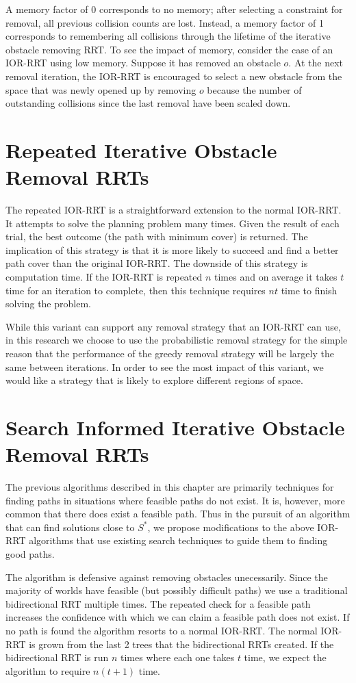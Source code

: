 A memory factor of 0 corresponds to no memory; after selecting a constraint for removal, all previous collision counts are lost. Instead, a memory factor of 1 corresponds to remembering all collisions through the lifetime of the iterative obstacle removing RRT. To see the impact of memory, consider the case of an IOR-RRT using low memory. Suppose it has removed an obstacle $o$. At the next removal iteration, the IOR-RRT is encouraged to select a new obstacle from the space that was newly opened up by removing $o$ because the number of outstanding collisions since the last removal have been scaled down. 

\section{Repeated Iterative Obstacle Removal RRTs}
The repeated IOR-RRT is a straightforward extension to the normal IOR-RRT. It attempts to solve the planning problem many times. Given the result of each trial, the best outcome (the path with minimum cover) is returned. The implication of this strategy is that it is more likely to succeed and find a better path cover than the original IOR-RRT. The downside of this strategy is computation time. If the IOR-RRT is repeated $n$ times and on average it takes $t$ time for an iteration to complete, then this technique requires $nt$ time to finish solving the problem.

While this variant can support any removal strategy that an IOR-RRT can use, in this research we choose to use the probabilistic removal strategy for the simple reason that the performance of the greedy removal strategy will be largely the same between iterations. In order to see the most impact of this variant, we would like a strategy that is likely to explore different regions of space.

\section{Search Informed Iterative Obstacle Removal RRTs}
The previous algorithms described in this chapter are primarily techniques for finding paths in situations where feasible paths do not exist. It is, however, more common that there does exist a feasible path. Thus in the pursuit of an algorithm that can find solutions close to $S^{*}$, we propose modifications to the above IOR-RRT algorithms that use existing search techniques to guide them to finding good paths.

The algorithm is defensive against removing obstacles unecessarily. Since the majority of worlds have feasible (but possibly difficult paths) we use a traditional bidirectional RRT multiple times. The repeated check for a feasible path increases the confidence with which we can claim a feasible path does not exist. If no path is found the algorithm resorts to a normal IOR-RRT. The normal IOR-RRT is grown from the last 2 trees that the bidirectional RRTs created. If the bidirectional RRT is run $n$ times where each one takes $t$ time, we expect the algorithm to require $n(t+1)$ time. 

